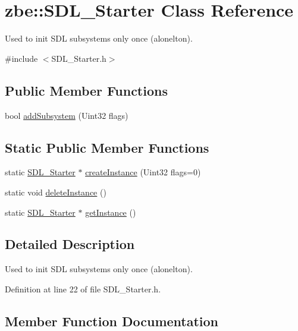 \hypertarget{classzbe_1_1_s_d_l___starter}{}\section{zbe\+:\+:S\+D\+L\+\_\+\+Starter Class Reference}
\label{classzbe_1_1_s_d_l___starter}


Used to init S\+D\+L subsystems only once (alonelton).  




{\ttfamily \#include $<$S\+D\+L\+\_\+\+Starter.\+h$>$}

\subsection*{Public Member Functions}
\begin{DoxyCompactItemize}
\item 
bool \hyperlink{classzbe_1_1_s_d_l___starter_a2a699a1cd9ee686fec81a491c0feef24}{add\+Subsystem} (Uint32 flags)
\end{DoxyCompactItemize}
\subsection*{Static Public Member Functions}
\begin{DoxyCompactItemize}
\item 
static \hyperlink{classzbe_1_1_s_d_l___starter}{S\+D\+L\+\_\+\+Starter} $\ast$ \hyperlink{classzbe_1_1_s_d_l___starter_a1ad467da339f54e91b446ccac984bb19}{create\+Instance} (Uint32 flags=0)
\item 
static void \hyperlink{classzbe_1_1_s_d_l___starter_ae14111197cb8103f36380d68bae78e98}{delete\+Instance} ()
\item 
static \hyperlink{classzbe_1_1_s_d_l___starter}{S\+D\+L\+\_\+\+Starter} $\ast$ \hyperlink{classzbe_1_1_s_d_l___starter_aca43aac3937f747d116d72e7e2374254}{get\+Instance} ()
\end{DoxyCompactItemize}


\subsection{Detailed Description}
Used to init S\+D\+L subsystems only once (alonelton). 

Definition at line 22 of file S\+D\+L\+\_\+\+Starter.\+h.



\subsection{Member Function Documentation}
\hypertarget{classzbe_1_1_s_d_l___starter_a2a699a1cd9ee686fec81a491c0feef24}{}
